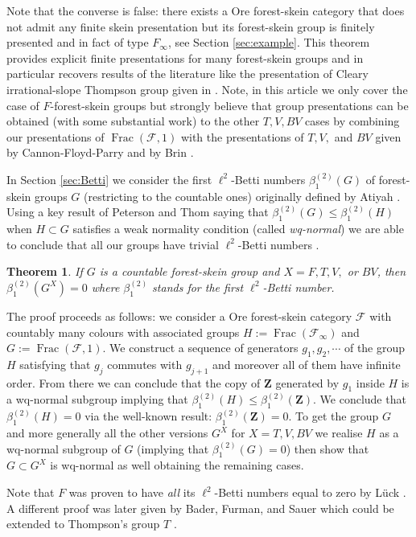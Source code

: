 \documentclass[a4paper, 12pt]{amsart}
\numberwithin{equation}{section}
\newtheorem{lettertheo}{Theorem}
\theoremstyle{definition}
\newcommand{\betti}{\beta^{(2)}_1}
\newcommand{\cF}{\mathcal F}
\DeclareMathOperator{\Frac}{Frac}
\newcommand{\Z}{\mathbf{Z}}
\begin{document}
Note that the converse is false: there exists a Ore forest-skein category that does not admit any finite skein presentation but its forest-skein group is finitely presented and in fact of type $F_\infty$, see Section \ref{sec:example}.
This theorem provides explicit finite presentations for many forest-skein groups and in particular recovers results of the literature like the presentation of Cleary irrational-slope Thompson group given in \cite{Burillo-Nucinkis-Reeves21}.
Note, in this article we only cover the case of $F$-forest-skein groups but strongly believe that group presentations can be obtained (with some substantial work) to the other $T,V,BV$ cases by combining our presentations of $\Frac(\cF,1)$ with the presentations of $T,V,$ and $BV$ given by Cannon-Floyd-Parry and by Brin \cite{Cannon-Floyd-Parry96,Brin-BV2}.

In Section \ref{sec:Betti} we consider the first $\ell^2$-Betti numbers $\betti(G)$ of forest-skein groups $G$ (restricting to the countable ones) originally defined by Atiyah \cite{Atiyah76}. Using a key result of Peterson and Thom saying that $\betti(G)\leq \betti(H)$ when $H\subset G$ satisfies a weak normality condition (called {\it wq-normal}) we are able to conclude that all our groups have trivial $\ell^2$-Betti numbers \cite{Peterson-Thom11}.
%
\begin{lettertheo}
If $G$ is a countable forest-skein group and $X=F,T,V,$ or $BV$, then $\betti(G^X)=0$ where $\betti$ stands for the first $\ell^2$-Betti number.
\end{lettertheo}
%
The proof proceeds as follows: we consider a Ore forest-skein category $\cF$ with countably many colours with associated groups $H:=\Frac(\cF_\infty)$ and $G:=\Frac(\cF,1)$. 
We construct a sequence of generators $g_1,g_2,\cdots$ of the group $H$ satisfying that $g_j$ commutes with $g_{j+1}$ and moreover all of them have infinite order. From there we can conclude that the copy of $\Z$ generated by $g_1$ inside $H$ is a wq-normal subgroup implying that $\betti(H)\leq \betti(\Z)$. We conclude that $\betti(H)=0$ via the well-known result: $\betti(\Z)=0$.
To get the group $G$ and more generally all the other versions $G^X$ for $X=T,V,BV$ we realise $H$ as a wq-normal subgroup of $G$ (implying that $\betti(G)=0$) then show that $G\subset G^X$ is wq-normal as well obtaining the remaining cases.

Note that $F$ was proven to have {\it all} its $\ell^2$-Betti numbers equal to zero by L\"uck \cite[Theorem 7.20]{Luck02}. 
A different proof was later given by Bader, Furman, and Sauer which could be extended to Thompson's group $T$ \cite[Theorem 1.8]{Bader-Furman-Sauer14}.
\end{document}
